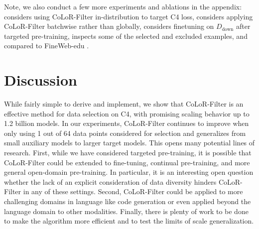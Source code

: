 \documentclass{article}
\newcommand{\Ddown}{D_{\text{down}}}
\begin{document}
\begin{table}[h]
    \caption{Task generalization for the 1.2b models with $ \tau = 64$.}
    \label{tab:tasks}
    \centering
\end{table}

Note, we also conduct a few more experiments and ablations in the appendix:  considers using CoLoR-Filter in-distribution to target C4 loss,  considers applying CoLoR-Filter batchwise rather than globally,  considers finetuning on $ \Ddown$ after targeted pre-training,  inspects some of the selected and excluded examples, and  compared to FineWeb-edu \citep{penedo2024fineweb}.


\section{Discussion}

While fairly simple to derive and implement, we show that CoLoR-Filter is an effective method for data selection on C4, with promising scaling behavior up to 1.2 billion models. 
In our experiments, CoLoR-Filter continues to improve when only using 1 out of 64 data points considered for selection and generalizes from small auxiliary models to larger target models. This opens many potential lines of research. First, while we have considered targeted pre-training, it is possible that CoLoR-Filter could be extended to fine-tuning, continual pre-training, and more general open-domain pre-training. In particular, it is an interesting open question whether the lack of an explicit consideration of data diversity hinders CoLoR-Filter in any of these settings. Second, CoLoR-Filter could be applied to more challenging domains in language like code generation or even applied beyond the language domain to other modalities. Finally, there is plenty of work to be done to make the algorithm more efficient and to test the limits of scale generalization. 
\end{document}
